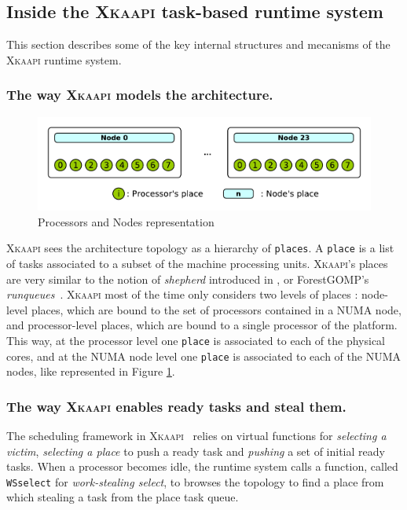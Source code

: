\documentclass{Styles/llncs}
\newcommand{\kaapi}{\textsc{\mbox{Xkaapi}}\xspace}
\begin{document}
\subsection{Inside the \kaapi task-based runtime system}

This section describes some of the key internal structures and mecanisms of the \kaapi runtime system.

\subsubsection{The way \kaapi models the architecture.}

\begin{figure}[t]
  \centering
  \includegraphics[scale=0.5]{./figures/topology.pdf}
\caption{Processors and Nodes representation}
\label{fig:detail-topology}
\end{figure}

\kaapi sees the architecture topology as a hierarchy of \verb/places/.
A \verb/place/ is a list of tasks associated to a subset of the machine processing units.
\kaapi's places are very similar to the notion of \emph{shepherd} introduced in \cite{DBLP:journals/ijhpca/OlivierPWSP12}, or ForestGOMP's \emph{runqueues}~\cite{BroFurGogWacNam10IJPP}.
\kaapi most of the time only considers two levels of places : node-level places, which are bound to the set of processors contained in a NUMA node, and processor-level places, which are bound to a single processor of the platform.
This way, at the processor level one \verb/place/ is associated to each of the physical cores, and
at the NUMA node level one \verb/place/ is associated to each of the NUMA nodes, like represented in
Figure \ref{fig:detail-topology}.


\subsubsection{The way \kaapi enables ready tasks and steal them.}
The scheduling framework in \kaapi~\cite{Bleuse2014} relies on virtual functions for \textit{selecting a victim}, \textit{selecting a place} to push a ready task and \textit{pushing} a set of initial ready tasks.
When a processor becomes idle, the runtime system calls a function, called  \verb/WSselect/ for \emph{work-stealing select}, to browses the topology to find a place from which stealing a task from the place task queue.
\end{document}
